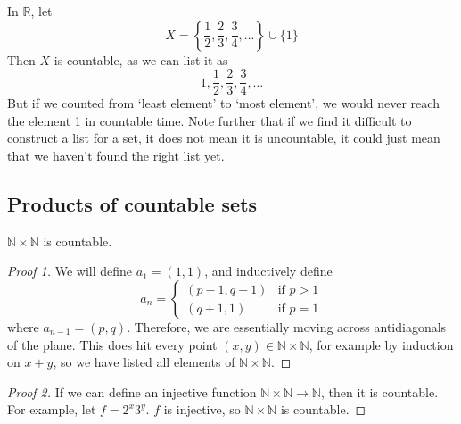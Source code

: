 \begin{remark}
	In \(\mathbb R\), let
	\[
		X = \left\{ \frac{1}{2}, \frac{2}{3}, \frac{3}{4}, \dots \right\} \cup \{ 1 \}
	\]
	Then \(X\) is countable, as we can list it as
	\[
		1, \frac{1}{2}, \frac{2}{3}, \frac{3}{4}, \dots
	\]
	But if we counted from `least element' to `most element', we would never reach the element 1 in countable time.
	Note further that if we find it difficult to construct a list for a set, it does not mean it is uncountable, it could just mean that we haven't found the right list yet.
\end{remark}

\subsection{Products of countable sets}
\begin{theorem}
	\(\mathbb N \times \mathbb N\) is countable.
\end{theorem}
\begin{proof}[Proof 1]
	We will define \(a_1 = (1, 1)\), and inductively define
	\[
		a_n = \begin{cases}
			(p-1, q+1) & \text{if } p > 1 \\
			(q+1, 1)   & \text{if } p = 1
		\end{cases}
	\]
	where \(a_{n-1} = (p, q)\).
	Therefore, we are essentially moving across antidiagonals of the plane.
	This does hit every point \((x, y) \in \mathbb N \times \mathbb N\), for example by induction on \(x+y\), so we have listed all elements of \(\mathbb N \times \mathbb N\).
\end{proof}
\begin{proof}[Proof 2]
	If we can define an injective function \(\mathbb N \times \mathbb N \to \mathbb N\), then it is countable.
	For example, let \(f = 2^x 3^y\).
	\(f\) is injective, so \(\mathbb N \times \mathbb N\) is countable.
\end{proof}

